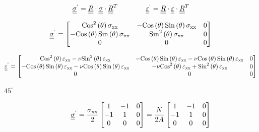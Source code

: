 \documentclass
[
a4paper,                      %
twoside,					  %
12pt,                         %
abstract,		      %
fleqn,                        %
]
{scrartcl} %
\begin{document}
\begin{enumerate}
\begin{itemize}
\begin{equation}
\underline{\underline{\sigma}}^{`}=\underline{\underline{R}}\cdot\underline{\underline{\sigma}}\cdot\underline{\underline{R}}^{T}\qquad\qquad\underline{\underline{\varepsilon}}^{`}=\underline{\underline{R}}\cdot\underline{\underline{\varepsilon}}\cdot\underline{\underline{R}}^{T}
\end{equation}

\begin{equation}
\underline{\underline{\sigma}}^{`}=\begin{bmatrix}
\text{Cos}^{2}\left(\theta\right)\sigma _{\text{xx}} & -\text{Cos}\left(\theta\right) \text{Sin}\left(\theta\right) \sigma_{\text{xx}} & 0 \\
 -\text{Cos}\left(\theta\right) \text{Sin}\left(\theta\right) \sigma_{\text{xx}}& \text{Sin}^{2}\left(\theta\right) \sigma_{\text{xx}} & 0 \\
 0 & 0 & 0 \\
\end{bmatrix}
\end{equation}

\begin{equation}
\underline{\underline{\varepsilon}}^{`}=\begin{bmatrix}
\text{Cos}^{2}\left(\theta\right) \varepsilon _{\text{xx}}-\nu  \text{Sin}^{2}\left(\theta\right) \varepsilon _{\text{xx}} & -\text{Cos}\left(\theta\right) \text{Sin}\left(\theta\right) \varepsilon
_{\text{xx}}-\nu  \text{Cos}\left(\theta\right) \text{Sin}\left(\theta\right) \varepsilon _{\text{xx}} & 0 \\
 -\text{Cos}\left(\theta\right) \text{Sin}\left(\theta\right) \varepsilon _{\text{xx}}-\nu  \text{Cos}\left(\theta\right) \text{Sin}\left(\theta\right) \varepsilon _{\text{xx}} & -\nu 
\text{Cos}^{2}\left(\theta\right) \varepsilon _{\text{xx}}+\text{Sin}^{2}\left(\theta\right) \varepsilon _{\text{xx}} & 0 \\
 0 & 0 & 0 \\
\end{bmatrix}
\end{equation}

\begin{description}
\item [$45^{\circ}$]

\begin{equation}
\underline{\underline{\sigma}}^{`}=\frac{\sigma_{\text{xx}}}{2}\begin{bmatrix}
1 & -1 & 0 \\
 -1& 1 & 0 \\
 0 & 0 & 0 \\
\end{bmatrix}=\frac{N}{2A}\begin{bmatrix}
1 & -1 & 0 \\
 -1& 1 & 0 \\
 0 & 0 & 0 \\
\end{bmatrix}
\end{equation}



\end{description}
\end{itemize}
\end{enumerate}
\end{document}
